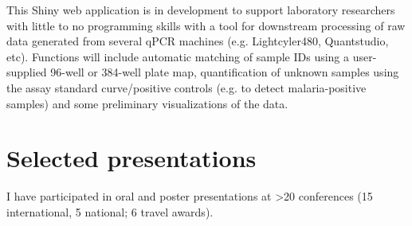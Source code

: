 \documentclass[11pt,a4paper,]{awesome-cv}
\begin{document}
\begin{cventries}
{\begin{cvitems}
\item This Shiny web application is in development to support laboratory researchers with little to no programming skills with a tool for downstream processing of raw data generated from several qPCR machines (e.g. Lightcyler480, Quantstudio, etc). Functions will include automatic matching of sample IDs using a user-supplied 96-well or 384-well plate map, quantification of unknown samples using the assay standard curve/positive controls (e.g. to detect malaria-positive samples) and some preliminary visualizations of the data.
\end{cvitems}}
\end{cventries}

\hypertarget{selected-presentations}{%
\section{Selected presentations}\label{selected-presentations}}

\footnotesize

I have participated in oral and poster presentations at \textgreater20
conferences (15 international, 5 national; 6 travel awards).
\end{document}
